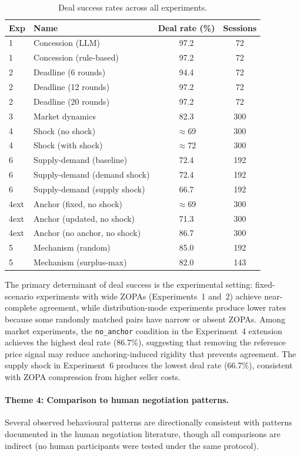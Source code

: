 \begin{table}[ht]
\centering
\caption{Deal success rates across all experiments.}
\label{tab:deal-rates}
\small
\begin{tabular}{@{}llcc@{}}
\toprule
Exp & Name & Deal rate (\%) & Sessions \\
\midrule
1 & Concession (LLM) & 97.2 & 72 \\
1 & Concession (rule-based) & 97.2 & 72 \\
2 & Deadline (6 rounds) & 94.4 & 72 \\
2 & Deadline (12 rounds) & 97.2 & 72 \\
2 & Deadline (20 rounds) & 97.2 & 72 \\
3 & Market dynamics & 82.3 & 300 \\
4 & Shock (no shock) & $\approx$69 & 300 \\
4 & Shock (with shock) & $\approx$72 & 300 \\
6 & Supply-demand (baseline) & 72.4 & 192 \\
6 & Supply-demand (demand shock) & 72.4 & 192 \\
6 & Supply-demand (supply shock) & 66.7 & 192 \\
4ext & Anchor (fixed, no shock) & $\approx$69 & 300 \\
4ext & Anchor (updated, no shock) & 71.3 & 300 \\
4ext & Anchor (no anchor, no shock) & 86.7 & 300 \\
5 & Mechanism (random) & 85.0 & 192 \\
5 & Mechanism (surplus-max) & 82.0 & 143 \\
\bottomrule
\end{tabular}
\end{table}

The primary determinant of deal success is the experimental setting: fixed-scenario experiments with wide ZOPAs (Experiments~1 and~2) achieve near-complete agreement, while distribution-mode experiments produce lower rates because some randomly matched pairs have narrow or absent ZOPAs.  Among market experiments, the \texttt{no\_anchor} condition in the Experiment~4 extension achieves the highest deal rate (86.7\%), suggesting that removing the reference price signal may reduce anchoring-induced rigidity that prevents agreement.  The supply shock in Experiment~6 produces the lowest deal rate (66.7\%), consistent with ZOPA compression from higher seller costs.

\paragraph{Theme 4: Comparison to human negotiation patterns.}
Several observed behavioural patterns are directionally consistent with patterns documented in the human negotiation literature, though all comparisons are indirect (no human participants were tested under the same protocol).

